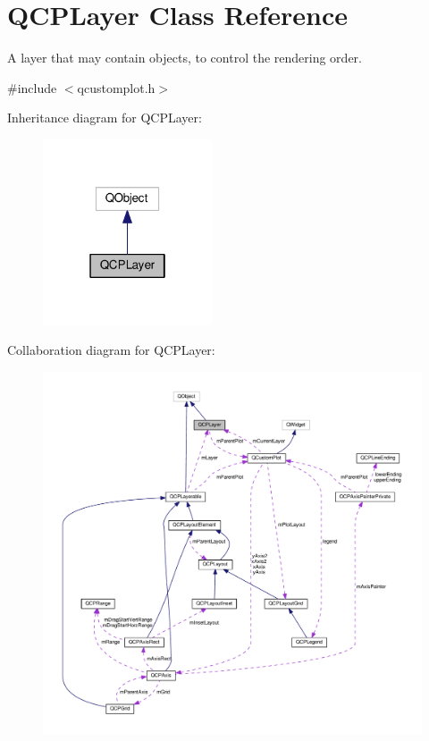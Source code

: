 \hypertarget{classQCPLayer}{}\section{Q\+C\+P\+Layer Class Reference}
\label{classQCPLayer}


A layer that may contain objects, to control the rendering order.  




{\ttfamily \#include $<$qcustomplot.\+h$>$}



Inheritance diagram for Q\+C\+P\+Layer\+:
\nopagebreak
\begin{figure}[H]
\begin{center}
\leavevmode
\includegraphics[width=142pt]{classQCPLayer__inherit__graph}
\end{center}
\end{figure}


Collaboration diagram for Q\+C\+P\+Layer\+:
\nopagebreak
\begin{figure}[H]
\begin{center}
\leavevmode
\includegraphics[width=350pt]{classQCPLayer__coll__graph}
\end{center}
\end{figure}

